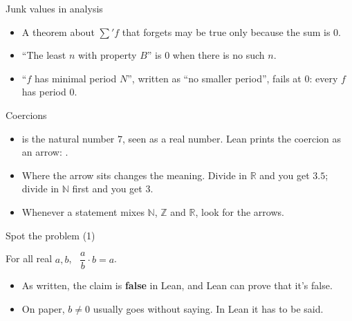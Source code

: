 \documentclass[10pt, aspectratio=169]{beamer}
\begin{document}
\begin{frame}[fragile]{Junk values in analysis}

\begin{itemize}
\item A theorem about $\sum' f$ that forgets  may be true only because the sum is $0$.
\item ``The least $n$ with property $B$'' is $0$ when there is no such $n$.
\item ``$f$ has minimal period $N$'', written as ``no smaller period'', fails at $0$: every $f$ has period $0$.
\end{itemize}
\end{frame}

\begin{frame}[fragile]{Coercions}

\vspace{0.4em}
\begin{itemize}
\item {} is the natural number $7$, seen as a real number. Lean prints the coercion as an arrow: .
\item Where the arrow sits changes the meaning. Divide in $\mathbb{R}$ and you get $3.5$; divide in $\mathbb{N}$ first and you get $3$.
\item Whenever a statement mixes $\mathbb{N}$, $\mathbb{Z}$ and $\mathbb{R}$, look for the arrows.
\end{itemize}
\end{frame}

\begin{frame}[fragile,t]{Spot the problem (1)}
\begin{paper}[Claim]
For all real $a, b$, \ $\dfrac{a}{b} \cdot b = a$.
\end{paper}

\pause
{}

\begin{itemize}
\item As written, the claim is \textbf{false} in Lean, and Lean can prove that it's false.
\item On paper, $b \ne 0$ usually goes without saying. In Lean it has to be said.
\end{itemize}
\end{frame}
\end{document}
